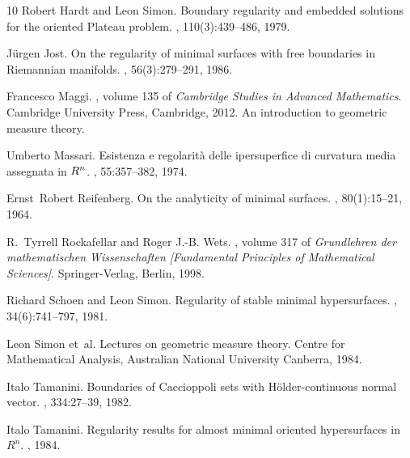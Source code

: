\documentclass[a4paper,reqno,11pt]{amsart}
\begin{document}
\begin{thebibliography}{10}
Robert Hardt and Leon Simon.
\newblock Boundary regularity and embedded solutions for the oriented {P}lateau
  problem.
, 110(3):439--486, 1979.

J\"{u}rgen Jost.
\newblock On the regularity of minimal surfaces with free boundaries in
  {R}iemannian manifolds.
, 56(3):279--291, 1986.

Francesco Maggi.
,
  volume 135 of {\em Cambridge Studies in Advanced Mathematics}.
\newblock Cambridge University Press, Cambridge, 2012.
\newblock An introduction to geometric measure theory.

Umberto Massari.
\newblock Esistenza e regolarit\`a{} delle ipersuperfice di curvatura media
  assegnata in {$R\sp{n}$}.
, 55:357--382, 1974.

Ernst~Robert Reifenberg.
\newblock On the analyticity of minimal surfaces.
, 80(1):15--21, 1964.

R.~Tyrrell Rockafellar and Roger J.-B. Wets.
, volume 317 of {\em Grundlehren der
  mathematischen Wissenschaften [Fundamental Principles of Mathematical
  Sciences]}.
\newblock Springer-Verlag, Berlin, 1998.

Richard Schoen and Leon Simon.
\newblock Regularity of stable minimal hypersurfaces.
, 34(6):741--797, 1981.

Leon Simon et~al.
\newblock Lectures on geometric measure theory.
\newblock Centre for Mathematical Analysis, Australian National University
  Canberra, 1984.

Italo Tamanini.
\newblock Boundaries of {C}accioppoli sets with {H}\"{o}lder-continuous normal
  vector.
, 334:27--39, 1982.

Italo Tamanini.
\newblock Regularity results for almost minimal oriented hypersurfaces in
  {$R^n$}.
, 1984.

\end{thebibliography}
\end{document}
